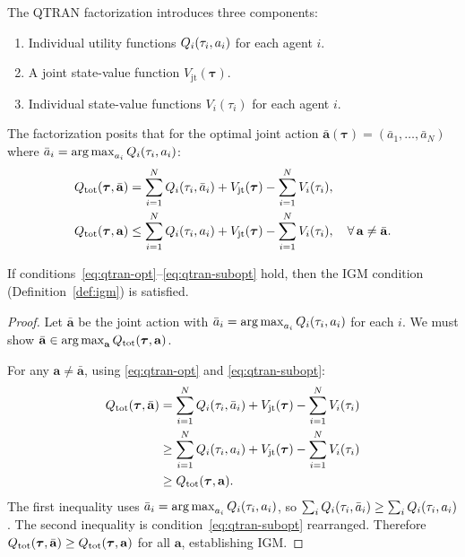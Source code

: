 \documentclass[11pt,a4paper]{article}
\begin{document}
\begin{definition}
\label{def:qtran}
The QTRAN factorization introduces three components:
\begin{enumerate}[nosep]
  \item Individual utility functions $Q_i(\tau_i, a_i)$
    for each agent $i$.
  \item A joint state-value function
    $V_{\mathrm{jt}}(\boldsymbol{\tau})$.
  \item Individual state-value functions $V_i(\tau_i)$ for
    each agent $i$.
\end{enumerate}
The factorization posits that for the optimal joint action
$\bar{\mathbf{a}}(\boldsymbol{\tau}) = (\bar{a}_1, \ldots,
\bar{a}_N)$ where $\bar{a}_i = \operatorname{arg\,max}_{a_i} Q_i(\tau_i,
a_i)$:
\begin{align}
  Q_{\mathrm{tot}}(\boldsymbol{\tau}, \bar{\mathbf{a}})
  &= \sum_{i=1}^N Q_i(\tau_i, \bar{a}_i)
     + V_{\mathrm{jt}}(\boldsymbol{\tau})
     - \sum_{i=1}^N V_i(\tau_i),
     \label{eq:qtran-opt} \\
  Q_{\mathrm{tot}}(\boldsymbol{\tau}, \mathbf{a})
  &\leq \sum_{i=1}^N Q_i(\tau_i, a_i)
     + V_{\mathrm{jt}}(\boldsymbol{\tau})
     - \sum_{i=1}^N V_i(\tau_i),
     \quad \forall\, \mathbf{a} \neq \bar{\mathbf{a}}.
     \label{eq:qtran-subopt}
\end{align}
\end{definition}

\begin{proposition}
\label{prop:qtran-igm}
If conditions~\eqref{eq:qtran-opt}--\eqref{eq:qtran-subopt}
hold, then the IGM condition (Definition~\ref{def:igm}) is
satisfied.
\end{proposition}

\begin{proof}
Let $\bar{\mathbf{a}}$ be the joint action with $\bar{a}_i =
\operatorname{arg\,max}_{a_i} Q_i(\tau_i, a_i)$ for each $i$.
We must show $\bar{\mathbf{a}} \in \operatorname{arg\,max}_{\mathbf{a}}
Q_{\mathrm{tot}}(\boldsymbol{\tau}, \mathbf{a})$.

For any $\mathbf{a} \neq \bar{\mathbf{a}}$, using
\eqref{eq:qtran-opt} and \eqref{eq:qtran-subopt}:
\begin{align*}
  Q_{\mathrm{tot}}(\boldsymbol{\tau}, \bar{\mathbf{a}})
  &= \sum_{i=1}^N Q_i(\tau_i, \bar{a}_i)
     + V_{\mathrm{jt}}(\boldsymbol{\tau})
     - \sum_{i=1}^N V_i(\tau_i) \\
  &\geq \sum_{i=1}^N Q_i(\tau_i, a_i)
     + V_{\mathrm{jt}}(\boldsymbol{\tau})
     - \sum_{i=1}^N V_i(\tau_i) \\
  &\geq Q_{\mathrm{tot}}(\boldsymbol{\tau}, \mathbf{a}).
\end{align*}
The first inequality uses $\bar{a}_i = \operatorname{arg\,max}_{a_i}
Q_i(\tau_i, a_i)$, so $\sum_i Q_i(\tau_i, \bar{a}_i)
\geq \sum_i Q_i(\tau_i, a_i)$.  The second inequality
is condition~\eqref{eq:qtran-subopt} rearranged.
Therefore $Q_{\mathrm{tot}}(\boldsymbol{\tau}, \bar{\mathbf{a}}) \geq
Q_{\mathrm{tot}}(\boldsymbol{\tau}, \mathbf{a})$ for all $\mathbf{a}$,
establishing IGM.
\end{proof}
\end{document}
